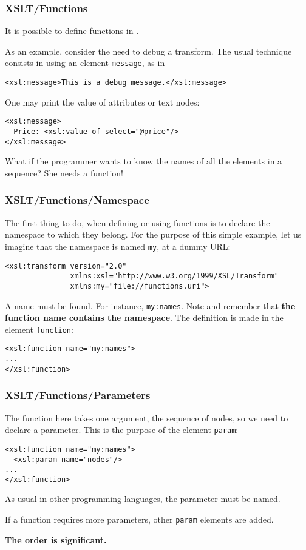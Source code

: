 %
\begin{frame}[containsverbatim]
\frametitle{XSLT/Functions}

It is possible to define functions in \XSLT.

As an example, consider the need to debug a transform. The usual
technique consists in using an \XSLT element \texttt{message}, as in
{\small
\begin{verbatim}
<xsl:message>This is a debug message.</xsl:message>
\end{verbatim}
}
One may print the value of attributes or text nodes:
{\small
\begin{verbatim}
<xsl:message>
  Price: <xsl:value-of select="@price"/>
</xsl:message>
\end{verbatim}
}
What if the programmer wants to know the names of all the elements in
a sequence? She needs a function!

\end{frame}

%
\begin{frame}[containsverbatim] 
\frametitle{XSLT/Functions/Namespace}

The first thing to do, when defining or using functions is to declare
the namespace to which they belong. For the purpose of this simple
example, let us imagine that the namespace is named \texttt{my}, at a
dummy URL:
{\small
\begin{verbatim}
<xsl:transform version="2.0"
               xmlns:xsl="http://www.w3.org/1999/XSL/Transform"
               xmlns:my="file://functions.uri">
\end{verbatim}
}
A name must be found. For instance, \texttt{my:names}. Note and
remember that \textbf{the function name contains the namespace}. The
definition is made in the \XSLT element \texttt{function}:
{\small
\begin{verbatim}
<xsl:function name="my:names">
...
</xsl:function>
\end{verbatim}
}

\end{frame}

%
\begin{frame}[containsverbatim]
\frametitle{XSLT/Functions/Parameters}

The function here takes one argument, the sequence of nodes, so we
need to declare a parameter. This is the purpose of the \XSLT element
\texttt{param}:
{\small
\begin{verbatim}
<xsl:function name="my:names">
  <xsl:param name="nodes"/>
...
</xsl:function>
\end{verbatim}
}
As usual in other programming languages, the parameter must be named. 

If a function requires more parameters, other \texttt{param} elements
are added. 

\textbf{The order is significant.}

\end{frame}



